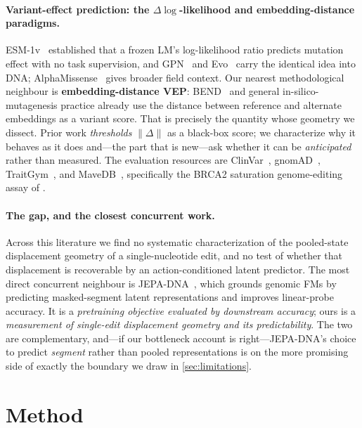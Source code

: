 \documentclass{article}
\newcommand{\D}{\Delta}
\begin{document}
\paragraph{Variant-effect prediction: the $\Delta\log$-likelihood and embedding-distance paradigms.}
ESM-1v~\citep{esm1v2021} established that a frozen LM's log-likelihood ratio predicts mutation
effect with no task supervision, and GPN~\citep{gpn2023} and Evo~\citep{evo2024} carry the identical
idea into DNA; AlphaMissense~\citep{alphamissense2023} gives broader field context. Our nearest
methodological neighbour is \textbf{embedding-distance VEP}: BEND~\citep{bend2024} and general
in-silico-mutagenesis practice already use the distance between reference and alternate embeddings
as a variant score. That is precisely the quantity whose geometry we dissect. Prior work
\emph{thresholds} $\lVert\D\rVert$ as a black-box score; we characterize why it behaves as it does
and---the part that is new---ask whether it can be \emph{anticipated} rather than measured. The
evaluation resources are ClinVar~\citep{clinvar2014}, gnomAD~\citep{gnomad2020},
TraitGym~\citep{traitgym2025}, and MaveDB~\citep{mavedb2025}, specifically the BRCA2 saturation
genome-editing assay of \citet{sahu2025}.

\paragraph{The gap, and the closest concurrent work.}
Across this literature we find no systematic characterization of the pooled-state displacement
geometry of a single-nucleotide edit, and no test of whether that displacement is recoverable by an
action-conditioned latent predictor. The most direct concurrent neighbour is
JEPA-DNA~\citep{jepadna2026}, which grounds genomic FMs by predicting masked-segment latent
representations and improves linear-probe accuracy. It is a \emph{pretraining objective evaluated by
downstream accuracy}; ours is a \emph{measurement of single-edit displacement geometry and its
predictability}. The two are complementary, and---if our bottleneck account is right---JEPA-DNA's
choice to predict \emph{segment} rather than pooled representations is on the more promising side
of exactly the boundary we draw in \cref{sec:limitations}.

\section{Method}
\label{sec:method}
\end{document}
